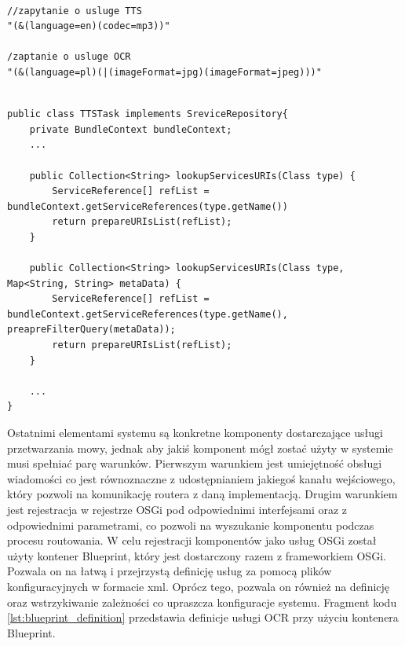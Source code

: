 \lstset{language=Java, tabsize=4, caption=Przykładowe zapytania LDAP zawierające parametry dotyczące usług przetwarzania mowy. ,label=lst:ldap_tts_query}

\begin{center}
\begin{lstlisting}

//zapytanie o usluge TTS
"(&(language=en)(codec=mp3))"

/zaptanie o usluge OCR
"(&(language=pl)(|(imageFormat=jpg)(imageFormat=jpeg)))"


\end{lstlisting}
\end{center}

\lstset{language=Java, tabsize=4, caption=Częściowa definicja klasy OSGIServiceRepository będącą fasadą nad Rejestrem OSGi. ,label=lst:service_repository_impl}

\begin{center}
\begin{lstlisting}
public class TTSTask implements SreviceRepository{
	private BundleContext bundleContext;
	...
	
	public Collection<String> lookupServicesURIs(Class type) {
		ServiceReference[] refList = bundleContext.getServiceReferences(type.getName())
		return prepareURIsList(refList);
	}

	public Collection<String> lookupServicesURIs(Class type, Map<String, String> metaData) {
		ServiceReference[] refList = bundleContext.getServiceReferences(type.getName(), preapreFilterQuery(metaData));
		return prepareURIsList(refList);
	}

	...
}

\end{lstlisting}
\end{center}
Ostatnimi elementami systemu są konkretne komponenty dostarczające usługi przetwarzania mowy, jednak aby jakiś komponent mógł zostać użyty w systemie musi spełniać parę warunków. Pierwszym warunkiem jest umiejętność obsługi wiadomości co jest równoznaczne z udostępnianiem jakiegoś kanału wejściowego, który pozwoli na komunikację routera z daną implementacją. Drugim warunkiem jest rejestracja w rejestrze OSGi pod odpowiednimi interfejsami oraz z odpowiednimi parametrami, co pozwoli na wyszukanie komponentu podczas procesu routowania. W celu rejestracji komponentów jako usług OSGi został użyty kontener Blueprint, który jest dostarczony razem z frameworkiem OSGi. Pozwala on na łatwą i przejrzystą definicję usług za pomocą plików konfiguracyjnych w formacie xml. Oprócz tego, pozwala on również na definicję oraz wstrzykiwanie zależności co upraszcza konfiguracje systemu. Fragment kodu \ref{lst:blueprint_definition} przedstawia definicje usługi OCR przy użyciu kontenera Blueprint.

